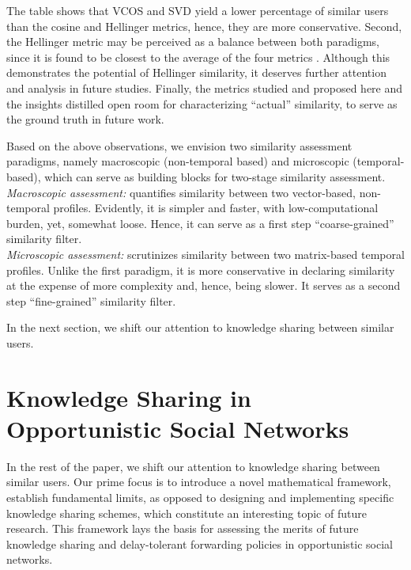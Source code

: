 \documentclass[12pt,epsf]{article}
\theoremstyle{definition}
\begin{document}
The table shows that VCOS and SVD yield a lower percentage of similar users
than the cosine and Hellinger metrics, hence, they are more conservative. 
Second, the Hellinger metric may be perceived as a balance between both 
paradigms, since it is found to be closest to the average of the four 
metrics \cite{Mai13}. Although this demonstrates the potential of Hellinger 
similarity, it deserves further attention and analysis in future 
studies. Finally, the metrics studied and proposed here and 
the insights distilled open room for characterizing ``actual'' similarity, 
to serve as the ground truth in future work. 

Based on the above observations, we envision two similarity
assessment paradigms, namely macroscopic (non-temporal based) and
microscopic (temporal-based), which can serve as building blocks for 
two-stage similarity assessment.\\
\textit{Macroscopic assessment:} quantifies
similarity between two vector-based, non-temporal profiles. Evidently,
it is simpler and faster, with low-computational burden, yet, somewhat loose. Hence, it can 
serve as a first step ``coarse-grained'' similarity filter.\\
\textit{Microscopic assessment:} scrutinizes similarity between two
matrix-based temporal profiles. Unlike the first paradigm, it is
more conservative in declaring similarity at the expense of more
complexity and, hence, being slower. It serves as a second step ``fine-grained'' 
similarity filter.

In the next section, we shift our attention to knowledge sharing between similar users.

\vspace{-1.0 cm}
\section{Knowledge Sharing in Opportunistic Social Networks}
\vspace{-0.3 cm}
In the rest of the paper, we shift our attention to knowledge sharing between similar users. Our prime focus is to introduce a novel mathematical framework, establish fundamental limits, as opposed to designing and implementing specific knowledge sharing schemes, which constitute an interesting topic of future research. This framework lays the basis for assessing the merits of future knowledge sharing and delay-tolerant forwarding policies in opportunistic social networks.
\end{document}
